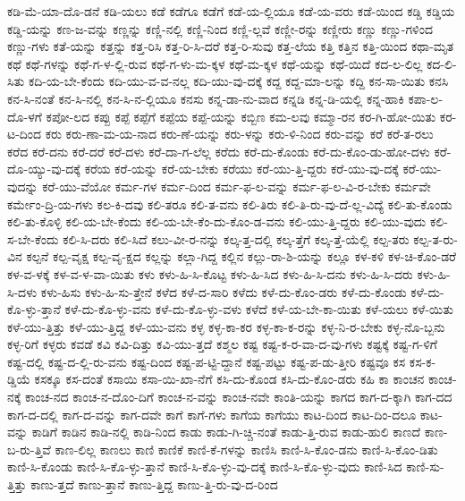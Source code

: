 {ಕಡಿ-ಮೆ-ಯಾ-ದೊ-ಡನೆ
ಕಡಿ-ಯಲು
ಕಡೆ
ಕಡೆಗೂ
ಕಡೆಗೆ
ಕಡೆ-ಯ-ಲ್ಲಿಯೂ
ಕಡೆ-ಯ-ವರು
ಕಡೆ-ಯಿಂದ
ಕಡ್ಡಿ
ಕಡ್ಡಿಯ
ಕಡ್ಡಿ-ಯನ್ನು
ಕಣ-ಜ-ವನ್ನು
ಕಣ್ಣನ್ನು
ಕಣ್ಣಿ-ನಲ್ಲಿ
ಕಣ್ಣಿ-ನಿಂದ
ಕಣ್ಣಿ-ಲ್ಲವೆ
ಕಣ್ಣೀ-ರನ್ನು
ಕಣ್ಣೀರು
ಕಣ್ಣು
ಕಣ್ಣು-ಗಳಿಂದ
ಕಣ್ಣು-ಗಳು
ಕತೆ-ಯನ್ನು
ಕತ್ತನ್ನು
ಕತ್ತ-ರಿಸಿ
ಕತ್ತ-ರಿ-ಸಿ-ದರೆ
ಕತ್ತ-ರಿ-ಸುವು
ಕತ್ತ-ಲೆಯ
ಕತ್ತಿ
ಕತ್ತಿನ
ಕತ್ತಿ-ಯಿಂದ
ಕಥಾ-ಮೃತ
ಕಥೆ
ಕಥೆ-ಗಳನ್ನು
ಕಥೆ-ಗ-ಳ-ಲ್ಲಿ-ರುವ
ಕಥೆ-ಗ-ಳು-ಮ-ಕ್ಕಳ
ಕಥೆ-ಮ-ಕ್ಕಳ
ಕಥೆ-ಯನ್ನು
ಕಥೆ-ಯಿದೆ
ಕದ-ಲ-ಲಿಲ್ಲ
ಕದ-ಲಿ-ಸಿತು
ಕದಿ-ಯ-ಬೇ-ಕೆಂದು
ಕದಿ-ಯು-ವ-ವ-ನಲ್ಲ
ಕದಿ-ಯು-ವು-ದಕ್ಕೆ
ಕದ್ದ
ಕದ್ದ-ಮಾ-ಲನ್ನು
ಕದ್ದಿ
ಕನ-ಸಾ-ಯಿತು
ಕನಸಿ
ಕನ-ಸಿ-ನಂತೆ
ಕನ-ಸಿ-ನಲ್ಲಿ
ಕನ-ಸಿ-ನ-ಲ್ಲಿಯೂ
ಕನಸು
ಕನ್ನ-ಡಾ-ನು-ವಾದ
ಕನ್ನಡಿ
ಕನ್ನ-ಡಿ-ಯಲ್ಲಿ
ಕನ್ನ-ಹಾಕಿ
ಕಪಾ-ಲ-ದೊ-ಳಗೆ
ಕಪೋ-ಲದ
ಕಪ್ಪು
ಕಪ್ಪೆ
ಕಪ್ಪೆಗೆ
ಕಪ್ಪೆಯ
ಕಪ್ಪೆ-ಯನ್ನು
ಕಬ್ಬಿಣ
ಕಮ-ಲವು
ಕಮ್ಮಾ-ರನ
ಕರ-ಗಿ-ಹೋ-ಯಿತು
ಕರ-ಟ-ದಿಂದ
ಕರು
ಕರು-ಣಾ-ಮ-ಯ-ನಾದ
ಕರು-ಣೆ-ಯನ್ನು
ಕರು-ಳನ್ನು
ಕರು-ಳಿ-ನಿಂದ
ಕರು-ವನ್ನು
ಕರೆ
ಕರೆ-ತ-ರಲು
ಕರೆದ
ಕರೆ-ದನು
ಕರೆ-ದರೆ
ಕರೆ-ದಳು
ಕರೆ-ದಾ-ಗ-ಲೆಲ್ಲ
ಕರೆದು
ಕರೆ-ದು-ಕೊಂಡು
ಕರೆ-ದು-ಕೊಂ-ಡು-ಹೋ-ದಳು
ಕರೆ-ದೊ-ಯ್ಯು-ವು-ದಕ್ಕೆ
ಕರೆಯ
ಕರೆ-ಯನ್ನು
ಕರೆ-ಯ-ಬೇಕು
ಕರೆಯು
ಕರೆ-ಯು-ತ್ತಿ-ದ್ದರು
ಕರೆ-ಯು-ವು-ದಕ್ಕೆ
ಕರೆ-ಯು-ವುದನ್ನು
ಕರೆ-ಯು-ವೆಯೋ
ಕರ್ಮ-ಗಳ
ಕರ್ಮ-ದಿಂದ
ಕರ್ಮ-ಫ-ಲ-ವನ್ನು
ಕರ್ಮ-ಫ-ಲ-ವಿ-ರ-ಬೇಕು
ಕರ್ಮವೇ
ಕರ್ಮೇಂ-ದ್ರಿ-ಯ-ಗಳು
ಕಲ-ಕಿ-ದವು
ಕಲಿ-ತರೂ
ಕಲಿ-ತ-ವನು
ಕಲಿ-ತಿರು
ಕಲಿ-ತಿ-ರು-ವು-ದೆ-ಲ್ಲ-ವಿದ್ಯೆ
ಕಲಿ-ತು-ಕೊಂಡು
ಕಲಿ-ತು-ಕೊಳ್ಳಿ
ಕಲಿ-ಯ-ಬೇ-ಕೆಂದು
ಕಲಿ-ಯ-ಬೇ-ಕೆಂ-ದು-ಕೊಂ-ಡ-ವನು
ಕಲಿ-ಯು-ತ್ತಿ-ದ್ದರು
ಕಲಿ-ಯು-ವುದು
ಕಲಿ-ಸ-ಬೇ-ಕೆಂದು
ಕಲಿ-ಸಿ-ದರು
ಕಲಿ-ಸಿದೆ
ಕಲು-ವೀ-ರ-ನನ್ನು
ಕಲ್ಕ-ತ್ತ-ದಲ್ಲಿ
ಕಲ್ಕ-ತ್ತೆಗೆ
ಕಲ್ಕ-ತ್ತೆ-ಯೆಲ್ಲಿ
ಕಲ್ಪ-ತರು
ಕಲ್ಪ-ತ-ರು-ವಿನ
ಕಲ್ಪನೆ
ಕಲ್ಪ-ವೃಕ್ಷ
ಕಲ್ಪ-ವೃ-ಕ್ಷದ
ಕಲ್ಲನ್ನು
ಕಲ್ಲಾ-ಗಿದ್ದ
ಕಲ್ಲಿನ
ಕಲ್ಲು-ರಾ-ಶಿ-ಯನ್ನು
ಕಲ್ಲೂ
ಕಳ-ಕಳಿ
ಕಳ-ಚಿ-ಕೊಂ-ಡರೆ
ಕಳ-ವ-ಳಕ್ಕೆ
ಕಳ-ವ-ಳ-ವಾ-ಯಿತು
ಕಳು
ಕಳು-ಹಿ-ಸಿ-ಕೊಟ್ಟ
ಕಳು-ಹಿ-ಸಿದ
ಕಳು-ಹಿ-ಸಿ-ದನು
ಕಳು-ಹಿ-ಸಿ-ದರು
ಕಳು-ಹಿ-ಸಿ-ದಳು
ಕಳು-ಹಿಸು
ಕಳು-ಹಿ-ಸು-ತ್ತೇನೆ
ಕಳೆದ
ಕಳೆ-ದ-ಸಾರಿ
ಕಳೆದು
ಕಳೆ-ದು-ಕೊಂ-ಡರು
ಕಳೆ-ದು-ಕೊಂಡು
ಕಳೆ-ದು-ಕೊ-ಳ್ಳು-ತ್ತಾನೆ
ಕಳೆ-ದು-ಕೊ-ಳ್ಳು-ವನು
ಕಳೆ-ದು-ಕೊ-ಳ್ಳು-ವಳು
ಕಳೆದೆ
ಕಳೆ-ಯ-ಬೇ-ಕಾ-ಯಿತು
ಕಳೆ-ಯಲು
ಕಳೆ-ಯಿತು
ಕಳೆ-ಯು-ತ್ತಿತ್ತು
ಕಳೆ-ಯು-ತ್ತಿದ್ದ
ಕಳೆ-ಯು-ವನು
ಕಳ್ಳ
ಕಳ್ಳ-ಕಾ-ಕರ
ಕಳ್ಳ-ಕಾ-ಕ-ರನ್ನು
ಕಳ್ಳ-ನಿ-ರ-ಬೇಕು
ಕಳ್ಳ-ನೊ-ಬ್ಬನು
ಕಳ್ಳ-ರಿಗೆ
ಕಳ್ಳರು
ಕವಡೆ
ಕವಿ
ಕವಿ-ದಿತ್ತು
ಕವಿ-ಯು-ತ್ತದೆ
ಕಶ್ಮಲ
ಕಷ್ಟ
ಕಷ್ಟ-ಕ-ರ-ವಾ-ದ-ವು-ಗಳು
ಕಷ್ಟಕ್ಕೆ
ಕಷ್ಟ-ಗ-ಳಿಗೆ
ಕಷ್ಟ-ದಲ್ಲಿ
ಕಷ್ಟ-ದ-ಲ್ಲಿ-ರು-ವನು
ಕಷ್ಟ-ದಿಂದ
ಕಷ್ಟ-ಪ-ಟ್ಟಿ-ದ್ದಾನೆ
ಕಷ್ಟ-ಪಟ್ಟು
ಕಷ್ಟ-ಪ-ಡು-ತ್ತೀರಿ
ಕಷ್ಟವೂ
ಕಸ
ಕಸ-ಕ-ಡ್ಡಿಯೆ
ಕಸಕ್ಕೂ
ಕಸ-ದಂತೆ
ಕಸಾಯಿ
ಕಸಾ-ಯಿ-ಖಾ-ನೆಗೆ
ಕಸಿ-ದು-ಕೊಂಡ
ಕಸಿ-ದು-ಕೊಂ-ಡರು
ಕಹಿ
ಕಾ
ಕಾಂಚನ
ಕಾಂಚ-ನಕ್ಕೆ
ಕಾಂಚ-ನದ
ಕಾಂಚ-ನ-ದೊಂ-ದಿಗೆ
ಕಾಂಚ-ನ-ವನ್ನು
ಕಾಂಚ-ನವೇ
ಕಾಂತಿ-ಯನ್ನು
ಕಾಗದ
ಕಾಗ-ದ-ಕ್ಕಾಗಿ
ಕಾಗ-ದದ
ಕಾಗ-ದ-ದಲ್ಲಿ
ಕಾಗ-ದ-ವನ್ನು
ಕಾಗ-ದವೇ
ಕಾಗೆ
ಕಾಗೆ-ಗಳು
ಕಾಗೆಯ
ಕಾಗೆಯು
ಕಾಟ-ದಿಂದ
ಕಾಟ-ದಿಂ-ದಲೂ
ಕಾಟ-ವನ್ನು
ಕಾಡಿಗೆ
ಕಾಡಿನ
ಕಾಡಿ-ನಲ್ಲಿ
ಕಾಡಿ-ನಿಂದ
ಕಾಡು
ಕಾಡು-ಗಿ-ಚ್ಚಿ-ನಂತೆ
ಕಾಡು-ತ್ತಿ-ರುವ
ಕಾಡು-ಹುಲಿ
ಕಾಣದೆ
ಕಾಣ-ಬ-ರು-ತ್ತಿವೆ
ಕಾಣ-ಲಿಲ್ಲ
ಕಾಣಲು
ಕಾಣಿ
ಕಾಣಿಕೆ
ಕಾಣಿ-ಕೆ-ಗಳನ್ನು
ಕಾಣಿಸಿ
ಕಾಣಿ-ಸಿ-ಕೊಂ-ಡನು
ಕಾಣಿ-ಸಿ-ಕೊಂ-ಡಿತು
ಕಾಣಿ-ಸಿ-ಕೊಂಡು
ಕಾಣಿ-ಸಿ-ಕೊ-ಳ್ಳು-ತ್ತಾನೆ
ಕಾಣಿ-ಸಿ-ಕೊ-ಳ್ಳು-ವು-ದಕ್ಕೆ
ಕಾಣಿ-ಸಿ-ಕೊ-ಳ್ಳು-ವುದು
ಕಾಣಿ-ಸಿದ
ಕಾಣಿ-ಸು-ತ್ತಿತ್ತು
ಕಾಣು-ತ್ತದೆ
ಕಾಣು-ತ್ತಾನೆ
ಕಾಣು-ತ್ತಿದ್ದ
ಕಾಣು-ತ್ತಿ-ರು-ವು-ದ-ರಿಂದ
}
